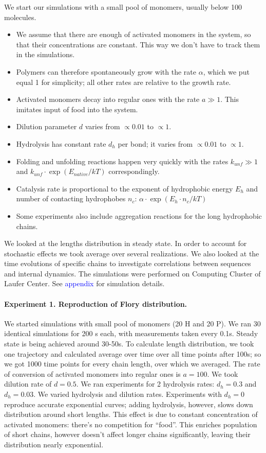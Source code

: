 \documentclass[12pt]{paper}
\newcommand{\ga}{\alpha}
\newcommand{\blue}[1]{\textcolor{blue}{#1}}
\begin{document}
We start our simulations with a small pool of monomers, usually below 100 molecules. 
\begin{itemize}
 \item We assume 
that there are enough of activated monomers in the system, so that their concentrations are 
constant. This way we don't have to track them in the simulations.
\item Polymers can therefore 
spontaneously grow with the rate $\ga$, which we put equal 1 for simplicity; all other rates are 
relative to the growth rate.
\item Activated monomers decay into regular ones with the rate $a\gg1$. This 
imitates input of food into the system. 
\item Dilution parameter $d$ varies from $\propto 0.01$ to 
$\propto 1$.
\item Hydrolysis has constant rate $d_h$ per bond; it varies from $\propto 0.01$ to $\propto 1$.
\item Folding and unfolding reactions happen very quickly with the rates $k_{unf}\gg1$ and 
$k_{unf}\cdot\exp(E_{native}/kT)$ correspondingly.
\item Catalysis rate is proportional to the exponent of hydrophobic energy $E_h$ and number of 
contacting hydrophobes $n_c$: $\ga\cdot\exp(E_{h}\cdot n_{c}/kT)$
\item Some experiments also include aggregation reactions for the long hydrophobic chains.
\end{itemize}
We looked at the lengths distribution in steady state. In order to account for stochastic effects 
we took average over several realizations. We also looked at the time evolutions of specific 
chains to investigate correlations between sequences and internal dynamics. The simulations were 
performed on Computing Cluster of Laufer Center. See \blue{appendix} for simulation details.

\paragraph{Experiment 1. Reproduction of Flory distribution.}
We started simulations with small pool of monomers (20 H and 20 P). We ran 30 identical  
simulations for 200 s each, with measurements taken every 0.1s. Steady state is being achieved 
around 30-50s. To calculate length distribution, we took one trajectory and calculated average 
over time over all time points after 100s; so we got 1000 time points for every chain length, over 
which we averaged. The rate of conversion of activated monomers into regular ones is $a=100$. We 
took dilution rate of $d=0.5$. We ran experiments for 2 hydrolysis rates: $d_h=0.3$ and $d_h=0.03$.
We varied hydrolysis and dilution rates. Experiments with $d_h=0$ reproduce accurate exponential 
curves; adding hydrolysis, however, slows down distribution around short lengths. This effect is 
due to constant concentration of activated monomers: there's no competition for ``food''. This 
enriches population of short chains, however doesn't affect longer chains significantly, leaving 
their distribution nearly exponential.
\end{document}
